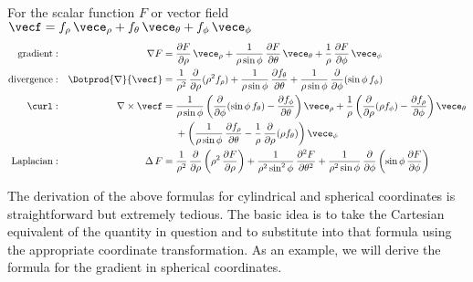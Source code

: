{{
\begin{keyidea}\label{ki_sph_sys}
For the scalar function $F$ or vector field $\vecf = f_{\rho}\,\vece_{\rho} + f_{\theta}\,\vece_{\theta} + f_{\phi}\,\vece_{\phi}$
 \begin{alignat*}{2}
  \text{gradient} &: & \nabla F &= \frac{\partial F}{\partial \rho}\,\vece_{\rho} +
   \frac{1}{\rho \sin \phi}\,\frac{\partial F}{\partial \theta}\,\vece_{\theta} +
   \frac{1}{\rho}\,\frac{\partial F}{\partial \phi}\,\vece_{\phi}\\
  \text{divergence} &: & \Dotprod{\nabla}{\vecf} &= \frac{1}{\rho^2}\,\frac{\partial}{\partial \rho}(\rho^2
   f_{\rho}) + \frac{1}{\rho \sin \phi}\,\frac{\partial f_{\theta}}{\partial \theta} +
   \frac{1}{\rho \sin \phi}\,\frac{\partial}{\partial \phi}(\sin \phi \,f_{\phi})\\
  \curl &:  & \nabla\times\vecf &=
   \frac{1}{\rho \sin \phi} \left( \frac{\partial}{\partial \phi}(\sin \phi\,f_{\theta}) -
    \frac{\partial f_{\phi}}{\partial \theta} \right) \vece_{\rho} +
   \frac{1}{\rho} \left( \frac{\partial}{\partial \rho}(\rho f_{\phi}) - \frac{\partial f_{\rho}}{\partial \phi}
    \right) \vece_{\theta}\\
    &\mathrel{\phantom{:}}  & &\mathrel{\phantom{=}} {} +
    \left( \frac{1}{\rho \sin \phi}\,\frac{\partial f_{\rho}}{\partial \theta} -
    \frac{1}{\rho}\,\frac{\partial}{\partial \rho}(\rho f_{\theta}) \right) \vece_{\phi}\\
  \text{Laplacian} &: & \Delta\,F &= \frac{1}{\rho^2}\,\frac{\partial}{\partial \rho} \left( \rho^2 \,
   \frac{\partial F}{\partial \rho} \right) + \frac{1}{\rho^2 \sin^2 \phi}\,\frac{\partial^2 F}{\partial \theta^2} +
   \frac{1}{\rho^2 \sin \phi}\,\frac{\partial}{\partial \phi} \left( \sin \phi \,\frac{\partial F}{\partial \phi}
   \right)
 \end{alignat*}
\end{keyidea}
}

The derivation of the above formulas for cylindrical and spherical coordinates is straightforward but extremely tedious. The basic idea is to take the Cartesian equivalent of the quantity in question and to substitute into that formula using the appropriate coordinate transformation. As an example, we will derive the formula for the gradient in spherical coordinates.

}
